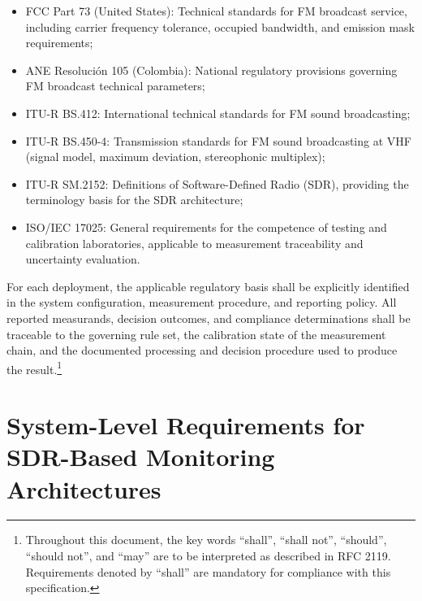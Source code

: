 \documentclass[11pt]{article}
\begin{document}
\begin{itemize}
    \item FCC Part 73 (United States): Technical standards for FM broadcast service, including carrier frequency tolerance, occupied bandwidth, and emission mask requirements;
    \item ANE Resoluci\'on 105 (Colombia): National regulatory provisions governing FM broadcast technical parameters;
    \item ITU-R BS.412: International technical standards for FM sound broadcasting;
    \item ITU-R BS.450-4: Transmission standards for FM sound broadcasting at VHF (signal model, maximum deviation, stereophonic multiplex);
    \item ITU-R SM.2152: Definitions of Software-Defined Radio (SDR), providing the terminology basis for the SDR architecture;
    \item ISO/IEC 17025: General requirements for the competence of testing and calibration laboratories, applicable to measurement traceability and uncertainty evaluation.
\end{itemize}

For each deployment, the applicable regulatory basis shall be explicitly identified in the system configuration, measurement procedure, and reporting policy. All reported measurands, decision outcomes, and compliance determinations shall be traceable to the governing rule set, the calibration state of the measurement chain, and the documented processing and decision procedure used to produce the result.\footnote{Throughout this document, the key words ``shall'', ``shall not'', ``should'', ``should not'', and ``may'' are to be interpreted as described in RFC 2119. Requirements denoted by ``shall'' are mandatory for compliance with this specification.}

\section{System-Level Requirements for SDR-Based Monitoring Architectures}
\end{document}

